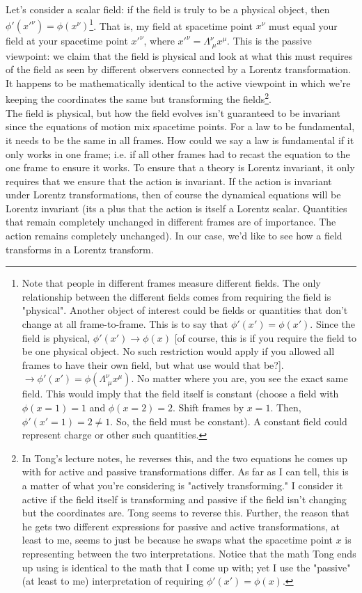 \noindent Let's consider a scalar field: if the field is truly to be a physical object, then $\phi'(x'^\nu)=\phi(x^\nu)$\footnote[6]{Note that people in different frames measure different fields. The only relationship between the different fields comes from requiring the field is "physical". Another object of interest could be fields or quantities that don't change at all frame-to-frame. This is to say that $\phi'(x')=\phi(x')$. Since the field is physical, $\phi'(x')\rightarrow\phi(x)$ [of course, this is if you require the field to be one physical object. No such restriction would apply if you allowed all frames to have their own field, but what use would that be?]. $\rightarrow \phi'(x')=\phi(\Lambda^\nu_{\;\mu}x^\mu)$. No matter where you are, you see the exact same field. This would imply that the field itself is constant (choose a field with $\phi(x = 1) = 1$ and $\phi(x=2)=2$. Shift frames by $x=1$. Then, $\phi'(x'=1)=2\ne 1$. So, the field must be constant). A constant field could represent charge or other such quantities.}. That is, my field at spacetime point $x^\nu$ must equal your field at your spacetime point $x'^\nu$, where $x'^\nu=\Lambda_{\;\mu}^\nu x^\mu$. This is the passive viewpoint: we claim that the field is physical and look at what this must requires of the field as seen by different observers connected by a Lorentz transformation. It happens to be mathematically identical to the active viewpoint in which we're keeping the coordinates the same but transforming the fields\footnote{In Tong's lecture notes, he reverses this, and the two equations he comes up with for active and passive transformations differ. As far as I can tell, this is a matter of what you're considering is "actively transforming." I consider it active if the field itself is transforming and passive if the field isn't changing but the coordinates are. Tong seems to reverse this. Further, the reason that he gets two different expressions for passive and active transformations, at least to me, seems to just be because he swaps what the spacetime point $x$ is representing between the two interpretations. Notice that the math Tong ends up using is identical to the math that I come up with; yet I use the "passive" (at least to me) interpretation of requiring $\phi'(x') = \phi(x)$.}. \\

\noindent The field is physical, but how the field evolves isn't guaranteed to be invariant since the equations of motion mix spacetime points. For a law to be fundamental, it needs to be the same in all frames. How could we say a law is fundamental if it only works in one frame; i.e. if all other frames had to recast the equation to the one frame to ensure it works. To ensure that a theory is Lorentz invariant, it only requires that we ensure that the action is invariant. If the action is invariant under Lorentz transformations, then of course the dynamical equations will be Lorentz invariant (its a plus that the action is itself a Lorentz scalar. Quantities that remain completely unchanged in different frames are of importance. The action remains completely unchanged). In our case, we'd like to see how a field transforms in a Lorentz transform.\\

